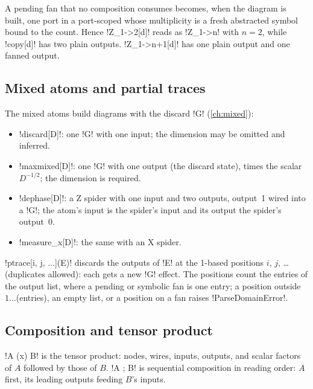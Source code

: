 A pending fan that no composition consumes becomes, when the diagram is built, one port in a port-scoped \bbox{} whose multiplicity is a fresh abstracted symbol bound to the count. Hence \code!Z_{1->2}[d]! reads as \code!Z_{1->n}! with $n=2$, while \code!copy[d]! has two plain outputs. \code!Z_{1->n+1}[d]! has one plain output and one fanned output.

\subsection{Mixed atoms and partial traces}\label{sec:language-dirac-mixed}

The mixed atoms build diagrams with the discard \code!G! (\cref{ch:mixed}):
\begin{itemize}
\item \code!discard[D]!: one \code!G! with one input; the dimension may be omitted and inferred.
\item \code!maxmixed[D]!: one \code!G! with one output (the discard state), times the scalar $D^{-1/2}$; the dimension is required.
\item \code!dephase[D]!: a Z spider with one input and two outputs, output~1 wired into a \code!G!; the atom's input is the spider's input and its output the spider's output~0.
\item \code!measure_x[D]!: the same with an X spider.
\end{itemize}
\code!ptrace[i, j, ...](E)! discards the outputs of \code!E! at the 1-based positions $i$, $j$, \ldots{} (duplicates allowed): each gets a new \code!G! effect. The positions count the entries of the output list, where a pending or symbolic fan is one entry; a position outside $1\ldots$(entries), an empty list, or a position on a fan raises \py!ParseDomainError!.

\subsection{Composition and tensor product}\label{sec:language-dirac-compose}

\code!A (x) B! is the tensor product: nodes, wires, inputs, outputs, and scalar factors of $A$ followed by those of $B$. \code!A ; B! is sequential composition in reading order: $A$ first, its leading outputs feeding $B$'s inputs.


